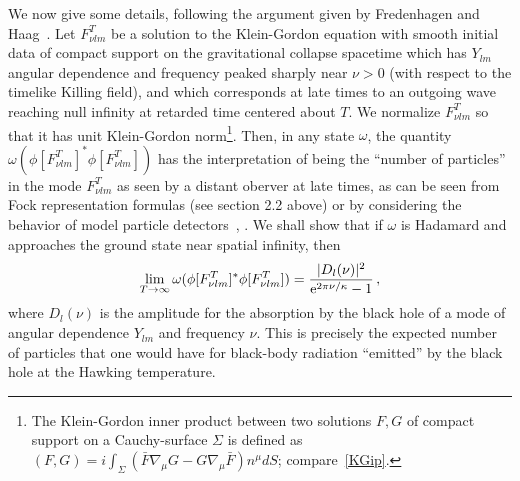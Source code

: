 \documentclass[12pt]{article}
\newcommand{\e}{{\rm e}}
\theoremstyle{plain}
\theoremstyle{definition}
\def\ben{\begin{equation}}
\def\een{\end{equation}}
\begin{document}
We now give some details, following the argument given by
Fredenhagen and Haag~\cite{fred1}.
Let $F^T_{\nu lm}$ be a solution to the Klein-Gordon equation
with smooth initial data of compact support
on the gravitational collapse spacetime
which has $Y_{lm}$ angular dependence and frequency peaked sharply
near $\nu > 0$ (with respect to
the timelike Killing field), and
which corresponds at late times to an outgoing wave reaching null infinity at retarded time
centered about $T$. We normalize $F^T_{\nu lm}$ so that it has unit Klein-Gordon
norm\footnote{The Klein-Gordon inner product between two solutions $F,G$ of compact
support on a Cauchy-surface $\Sigma$ is defined as
$(F,G) = i \int_\Sigma (\bar F \nabla_\mu G - G \nabla_\mu \bar F) n^\mu d S$;
compare~\eqref{KGip}.}. Then, in any state $\omega$, the quantity $\omega(\phi[F^T_{\nu lm}]^* \phi[F^T_{\nu lm}])$
has the interpretation of being the ``number of particles'' in the mode
$F^T_{\nu lm}$ as seen by a distant oberver at late times, as can be seen from
Fock representation formulas (see section 2.2 above) or by considering the
behavior of model particle detectors~\cite{fred4}, \cite{wald2}.
We shall show that if $\omega$ is Hadamard and approaches the ground state near spatial infinity, then
\ben\label{hawking}
\lim_{T \to \infty}
\omega(\phi[F^T_{\nu lm}]^* \phi[F^T_{\nu lm}]) =
\frac{|D_l(\nu)|^2}{\e^{2\pi\nu/\kappa}-1} \, ,
\een
where $D_l(\nu)$ is the
amplitude
for the absorption by the black hole of a mode of angular dependence $Y_{lm}$ and frequency $\nu$.
This is precisely the expected number of particles that one would have for black-body radiation ``emitted'' by the black hole at the Hawking temperature.
\end{document}

